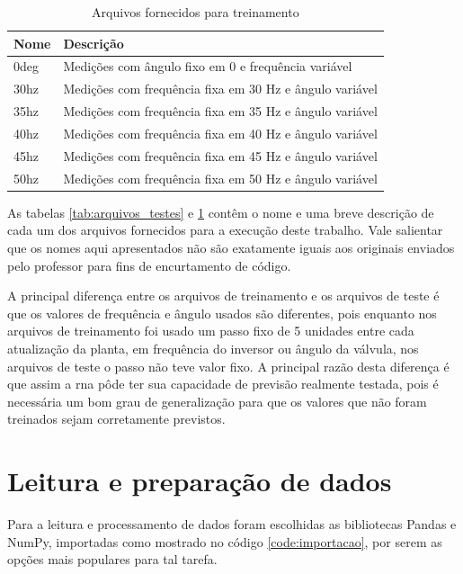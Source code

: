 \documentclass[12pt]{article}
\begin{document}
\begin{table}
\caption{Arquivos fornecidos para treinamento}
\centering
\begin{tabular}{|l|l|} 
\hline
Nome & Descrição \\ 
\hline
0deg & Medições com ângulo fixo em 0 e frequência variável \\ 
\hline
30hz & Medições com frequência fixa em 30 Hz e ângulo variável \\ 
\hline
35hz & Medições com frequência fixa em 35 Hz e ângulo variável \\ 
\hline
40hz & Medições com frequência fixa em 40 Hz e ângulo variável \\ 
\hline
45hz & Medições com frequência fixa em 45 Hz e ângulo variável \\ 
\hline
50hz & Medições com frequência fixa em 50 Hz e ângulo variável \\
\hline
\end{tabular}
\label{tab:arquivos_treinamento}
\end{table}

As tabelas \ref{tab:arquivos_testes} e \ref{tab:arquivos_treinamento} contêm o nome e uma breve descrição de cada um dos arquivos fornecidos para a execução deste trabalho. Vale salientar que os nomes aqui apresentados não são exatamente iguais aos originais enviados pelo professor para fins de encurtamento de código.

A principal diferença entre os arquivos de treinamento e os arquivos de teste é que os valores de frequência e ângulo usados são diferentes, pois enquanto nos arquivos de treinamento foi usado um passo fixo de 5 unidades entre cada atualização da planta, em frequência do inversor ou ângulo da válvula, nos arquivos de teste o passo não teve valor fixo.
A principal razão desta diferença é que assim a \acrshort{rna} pôde ter sua capacidade de previsão realmente testada, pois é necessária um bom grau de generalização para que os valores que não foram treinados sejam corretamente previstos.

\section{Leitura e preparação de dados}



Para a leitura e processamento de dados foram escolhidas as bibliotecas Pandas e NumPy, importadas como mostrado no código \ref{code:importacao}, por serem as opções mais populares para tal tarefa.
\end{document}
